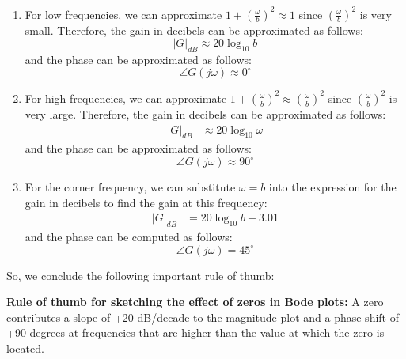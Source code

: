\documentclass{ee122_notes}
\begin{document}
\begin{enumerate}
  \item For low frequencies, we can approximate \( 1 + \left(\frac{\omega}{b}\right)^2 \approx 1 \) since \( \left(\frac{\omega}{b}\right)^2 \) is very small. Therefore, the gain in decibels can be approximated as follows:
\[
|G|_{dB} \approx 20 \log_{10} b
\]
and the phase can be approximated as follows:
\[
\angle G(j\omega) \approx 0^\circ
\]
  \item For high frequencies, we can approximate \( 1 + \left(\frac{\omega}{b}\right)^2 \approx \left(\frac{\omega}{b}\right)^2 \) since \( \left(\frac{\omega}{b}\right)^2 \) is very large. Therefore, the gain in decibels can be approximated as follows:
\begin{align*}
|G|_{dB} &\approx 20 \log_{10} \omega
\end{align*}
and the phase can be approximated as follows:
\[
\angle G(j\omega) \approx 90^\circ
\]
  \item For the corner frequency, we can substitute \( \omega = b \) into the expression for the gain in decibels to find the gain at this frequency:
\begin{align*}
|G|_{dB} &= 20 \log_{10} b + 3.01
\end{align*}
and the phase can be computed as follows:
\[
\angle G(j\omega) = 45^\circ
\]
\end{enumerate}
So, we conclude the following important rule of thumb:
\begin{center}
  \textbf{Rule of thumb for sketching the effect of zeros in Bode plots:} A zero contributes a slope of +20 dB/decade to the magnitude plot and a phase shift of +90 degrees at frequencies that are higher than the value at which the zero is located.
\end{center}
\end{document}
